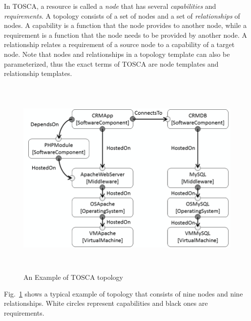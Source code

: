\documentclass[12pt]{report}
\begin{document}
In TOSCA, a resource is called a {\it node} that has several {\it
  capabilities} and {\it requirements}. A topology consists of a set
of nodes and a set of {\it relationships} of nodes.  A capability is a
function that the node provides to another node, while a requirement
is a function that the node needs to be provided by another node. A
relationship relates a requirement of a source node to a capability of
a target node. Note that nodes and relationships in a topology
template can also be parameterized, thus the exact terms of TOSCA are
node templates and relationship templates.
\begin{figure}
\centering
\includegraphics[height=10cm,natwidth=640,natheight=429]{./extopology.png}
\caption{An Example of TOSCA topology}
\label{fig:exampletopology}
\end{figure}
Fig.~\ref{fig:exampletopology} shows a typical example of topology
that consists of nine nodes and nine relationships. White circles
represent capabilities and black ones are requirements.
\end{document}
